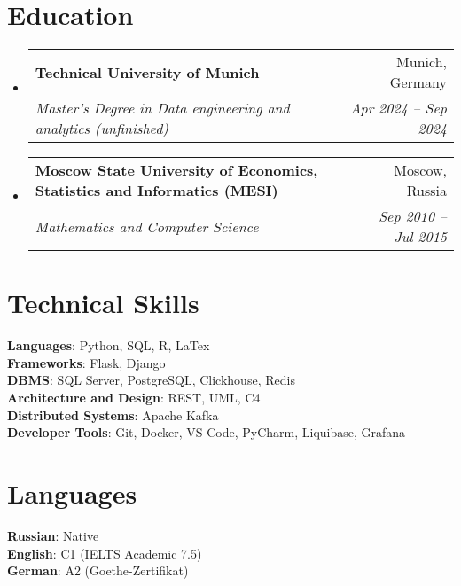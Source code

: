 \documentclass[letterpaper,11pt,english,russian]{article}
\newcommand{\resumeSubheading}[4]{
  \vspace{-2pt}\item
    \begin{tabularx}{0.95\textwidth}[t]{X r}
      \textbf{#1} & #2 \\
      \textit{\small #3} & \textit{\small #4} \\
    \end{tabularx}\vspace{-7pt}
}
\newcommand{\resumeSubHeadingListStart}{\begin{itemize}[leftmargin=0.15in, label={}]}
\newcommand{\resumeSubHeadingListEnd}{\end{itemize}}
\begin{document}
\section{Education}
  \resumeSubHeadingListStart
    \resumeSubheading
      {Technical University of Munich}{Munich, Germany}
      {Master's Degree in Data engineering and analytics (unfinished)}{Apr 2024 -- Sep 2024}
    \resumeSubheading
      {Moscow State University of Economics, Statistics and Informatics (MESI) }{Moscow, Russia}
      {Mathematics and Computer Science}{Sep 2010 -- Jul 2015}
  \resumeSubHeadingListEnd


%
\section{Technical Skills}
 \begin{itemize}[leftmargin=0.15in, label={}]
    \small{\item{
     \textbf{Languages}{: Python, SQL, R, LaTex} \\
     \textbf{Frameworks}{: Flask, Django} \\
     \textbf{DBMS}{: SQL Server, PostgreSQL, Clickhouse, Redis} \\
     \textbf{Architecture and Design}{: REST, UML, C4}\\
     \textbf{Distributed Systems}{: Apache Kafka} \\
     \textbf{Developer Tools}{: Git, Docker, VS Code, PyCharm, Liquibase, Grafana}
    }}
 \end{itemize}

%
\section{Languages}
 \begin{itemize}[leftmargin=0.15in, label={}]
    \small{\item{
     \textbf{Russian}{: Native} \\
     \textbf{English}{: C1 (IELTS Academic 7.5)} \\
     \textbf{German}{: A2 (Goethe-Zertifikat)}
    }}
 \end{itemize}

\end{document}
